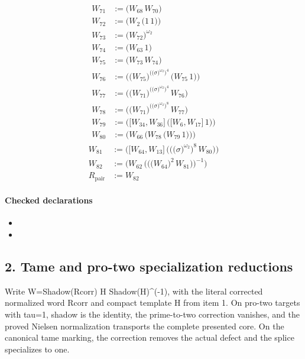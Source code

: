 \begin{align*}
W_{71} &:= \bigl(W_{68}\,W_{70}\bigr) \\
W_{72} &:= \bigl(W_{2}\,\bigl(1\,1\bigr)\bigr) \\
W_{73} &:= \bigl(W_{72}\bigr)^{\omega_2} \\
W_{74} &:= \bigl(W_{63}\,1\bigr) \\
W_{75} &:= \bigl(W_{73}\,W_{74}\bigr) \\
W_{76} &:= \bigl(\bigl(W_{75}\bigr)^{\bigl(\bigl(\sigma\bigr)^{\omega_2}\bigr)^{4}}\,\bigl(W_{75}\,1\bigr)\bigr) \\
W_{77} &:= \bigl(\bigl(W_{71}\bigr)^{\bigl(\bigl(\sigma\bigr)^{\omega_2}\bigr)^{4}}\,W_{76}\bigr) \\
W_{78} &:= \bigl(\bigl(W_{71}\bigr)^{\bigl(\bigl(\sigma\bigr)^{\omega_2}\bigr)^{8}}\,W_{77}\bigr) \\
W_{79} &:= \bigl(\bigl[W_{34},W_{36}\bigr]\,\bigl(\bigl[W_{6},W_{17}\bigr]\,1\bigr)\bigr) \\
W_{80} &:= \bigl(W_{66}\,\bigl(W_{78}\,\bigl(W_{79}\,1\bigr)\bigr)\bigr)
\end{align*}
\begin{align*}
W_{81} &:= \bigl(\bigl[W_{64},W_{13}\bigr]\,\bigl(\bigl(\bigl(\sigma\bigr)^{\omega_2}\bigr)^{8}\,W_{80}\bigr)\bigr) \\
W_{82} &:= \bigl(W_{62}\,\bigl(\bigl(\bigl(W_{64}\bigr)^{2}\,W_{81}\bigr)\bigr)^{-1}\bigr) \\
R_{\mathrm{pair}} &:= W_{82}
\end{align*}

\paragraph{Checked declarations}
\begin{itemize}
\item {}
\item {}
\end{itemize}

\subsection*{2. Tame and pro-two specialization reductions}
Write W=Shadow(Rcorr) H Shadow(H)\textasciicircum{}(-1), with the literal corrected normalized word Rcorr and compact template H from item 1. On pro-two targets with tau=1, shadow is the identity, the prime-to-two correction vanishes, and the proved Nielsen normalization transports the complete presented core. On the canonical tame marking, the correction removes the actual defect and the splice specializes to one.

